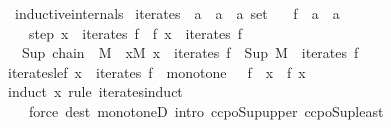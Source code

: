 \begin{isabellebody}
\endisatagproof
{\isafoldproof}%
%
\isadelimproof
%
\endisadelimproof
%
\isadelimdocument
%
\endisadelimdocument
%
\isatagdocument
%
\isamarkuptrue%
%
\endisatagdocument
{\isafolddocument}%
%
\isadelimdocument
%
\endisadelimdocument
{}\isamarkupfalse%
\ \ {\isacharbrackleft}{\kern0pt}{\isacharbrackleft}{\kern0pt}inductive{\isacharunderscore}{\kern0pt}internals{\isacharbrackright}{\kern0pt}{\isacharbrackright}{\kern0pt}\isanewline
{}\isanewline
\isanewline
{}\isamarkupfalse%
\ iterates\ {\isacharcolon}{\kern0pt}{\isacharcolon}{\kern0pt}\ {\isachardoublequoteopen}{\isacharparenleft}{\kern0pt}{\isacharprime}{\kern0pt}a\ {\isasymRightarrow}\ {\isacharprime}{\kern0pt}a{\isacharparenright}{\kern0pt}\ {\isasymRightarrow}\ {\isacharprime}{\kern0pt}a\ set{\isachardoublequoteclose}\isanewline
\ \ \ f\ {\isacharcolon}{\kern0pt}{\isacharcolon}{\kern0pt}\ {\isachardoublequoteopen}{\isacharprime}{\kern0pt}a\ {\isasymRightarrow}\ {\isacharprime}{\kern0pt}a{\isachardoublequoteclose}\isanewline
\ \ \isanewline
\ \ \ \ step{\isacharcolon}{\kern0pt}\ {\isachardoublequoteopen}x\ {\isasymin}\ iterates\ f\ {\isasymLongrightarrow}\ f\ x\ {\isasymin}\ iterates\ f{\isachardoublequoteclose}\isanewline
\ \ {\isacharbar}{\kern0pt}\ Sup{\isacharcolon}{\kern0pt}\ {\isachardoublequoteopen}chain\ {\isacharparenleft}{\kern0pt}{\isasymle}{\isacharparenright}{\kern0pt}\ M\ {\isasymLongrightarrow}\ {\isasymforall}x{\isasymin}M{\isachardot}{\kern0pt}\ x\ {\isasymin}\ iterates\ f\ {\isasymLongrightarrow}\ Sup\ M\ {\isasymin}\ iterates\ f{\isachardoublequoteclose}\isanewline
\isanewline
{}\isamarkupfalse%
\isanewline
\isanewline
{}\isamarkupfalse%
\ iterates{\isacharunderscore}{\kern0pt}le{\isacharunderscore}{\kern0pt}f{\isacharcolon}{\kern0pt}\ {\isachardoublequoteopen}x\ {\isasymin}\ iterates\ f\ {\isasymLongrightarrow}\ monotone\ {\isacharparenleft}{\kern0pt}{\isasymle}{\isacharparenright}{\kern0pt}\ {\isacharparenleft}{\kern0pt}{\isasymle}{\isacharparenright}{\kern0pt}\ f\ {\isasymLongrightarrow}\ x\ {\isasymle}\ f\ x{\isachardoublequoteclose}\isanewline
%
\isadelimproof
\ \ %
\endisadelimproof
%
\isatagproof
{}\isamarkupfalse%
\ {\isacharparenleft}{\kern0pt}induct\ x\ rule{\isacharcolon}{\kern0pt}\ iterates{\isachardot}{\kern0pt}induct{\isacharparenright}{\kern0pt}\isanewline
\ \ \ \ {\isacharparenleft}{\kern0pt}force\ dest{\isacharcolon}{\kern0pt}\ monotoneD\ intro{\isacharbang}{\kern0pt}{\isacharcolon}{\kern0pt}\ ccpo{\isacharunderscore}{\kern0pt}Sup{\isacharunderscore}{\kern0pt}upper\ ccpo{\isacharunderscore}{\kern0pt}Sup{\isacharunderscore}{\kern0pt}least{\isacharparenright}{\kern0pt}{\isacharplus}{\kern0pt}%

\end{isabellebody}
